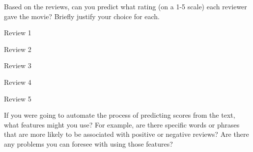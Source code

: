 \documentclass[11pt,letterpaper,boxed]{hmcpset}
\begin{document}
\begin{problem}
Based on the reviews, can you predict what rating (on a 1-5 scale)
each reviewer gave the movie? Briefly justify your choice for each.
\end{problem}
\begin{solution}

\begin{description}
    \item {Review 1} \vspace{2cm}
    \item {Review 2} \vspace{2cm}
    \item {Review 3} \vspace{2cm}
    \item {Review 4} \vspace{2cm}
    \item {Review 5} \vspace{2cm}
\end{description}

\end{solution}

\begin{problem}
If you were going to automate the process of predicting scores from
the text, what features might you use? For example, are there specific
words or phrases that are more likely to be associated with positive or
negative reviews? Are there any problems you can foresee with using those features?
\end{problem}
\begin{solution}
\vspace{6cm}
\end{solution}
\end{document}
